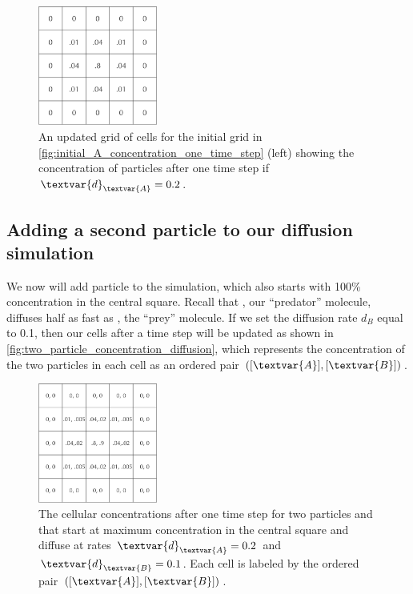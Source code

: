 \begin{figure}[h]
\centering
\mySfFamily
\includegraphics[width = 0.35\textwidth]{../images/A_concentration_slower_diffusion.png}
\caption{An updated grid of cells for the initial grid in \autoref{fig:initial_A_concentration_one_time_step} (left) showing the concentration of  particles after one time step if $\textvar{d}_\textvar{A} = \text{0.2}$.}
\label{fig:A_concentration_slower_diffusion}
\end{figure}

\FloatBarrier
{}
\subsection{Adding a second particle to our diffusion simulation}

We now will add particle  to the simulation, which also starts with 100\% concentration in the central square. Recall that , our ``predator'' molecule, diffuses half as fast as , the ``prey'' molecule. If we set the diffusion rate $d_B$ equal to 0.1, then our cells after a time step will be updated as shown in \autoref{fig:two_particle_concentration_diffusion}, which represents the concentration of the two particles in each cell as an ordered pair $([\textvar{A}], [\textvar{B}])$.\\

\begin{figure}[h]
\centering
\mySfFamily
\includegraphics[width = 0.35\textwidth]{../images/two_particle_concentration_diffusion.png}
\caption{The cellular concentrations after one time step for two particles  and  that start at maximum concentration in the central square and diffuse at rates $\textvar{d}_\textvar{A} = \text{0.2}$ and $\textvar{d}_\textvar{B} = \text{0.1}$. Each cell is labeled by the ordered pair $([\textvar{A}], [\textvar{B}])$.}
\label{fig:two_particle_concentration_diffusion}
\end{figure}

